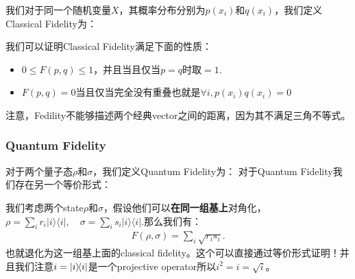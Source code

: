   我们对于同一个随机变量$ X $，其概率分布分别为$ p(x_i) $和$ q(x_i) $，我们定义Classical Fidelity为：

  \bigskip

  我们可以证明Classical Fidelity满足下面的性质：
  \begin{itemize}
    \item $ 0 \leq F(p,q) \leq 1 $，并且当且仅当$ p = q $时取$ =1 $.
    \item $ F(p,q) = 0 $当且仅当完全没有重叠也就是$ \forall i, p(x_i)q(x_i) = 0 $
  \end{itemize}
  注意，Fedility不能够描述两个经典vector之间的距离，因为其不满足三角不等式。

  \subsubsection{Quantum Fidelity}

  对于两个量子态$ \rho $和$ \sigma $，我们定义Quantum Fidelity为：
  对于Quantum Fidelity我们存在另一个等价形式：

  \bigskip

  我们考虑两个state$ \rho $和$ \sigma $，假设他们可以\textbf{在同一组基上}对角化，$
  \rho=\sum_ir_i|i\rangle\langle
  i|,\quad\sigma=\sum_is_i|i\rangle\langle i|. $那么我们有：
  \begin{align}
    F(\rho,\sigma)=\sum_i\sqrt{r_is_i}.
  \end{align}
  也就退化为这一组基上面的classical fidelity。这个可以直接通过等价形式证明！并且我们注意$ i
  =\left| i \middle\rangle\!\middle\langle i \right| $是一个projective operator所以$ i^2 = i = \sqrt{i} $。

